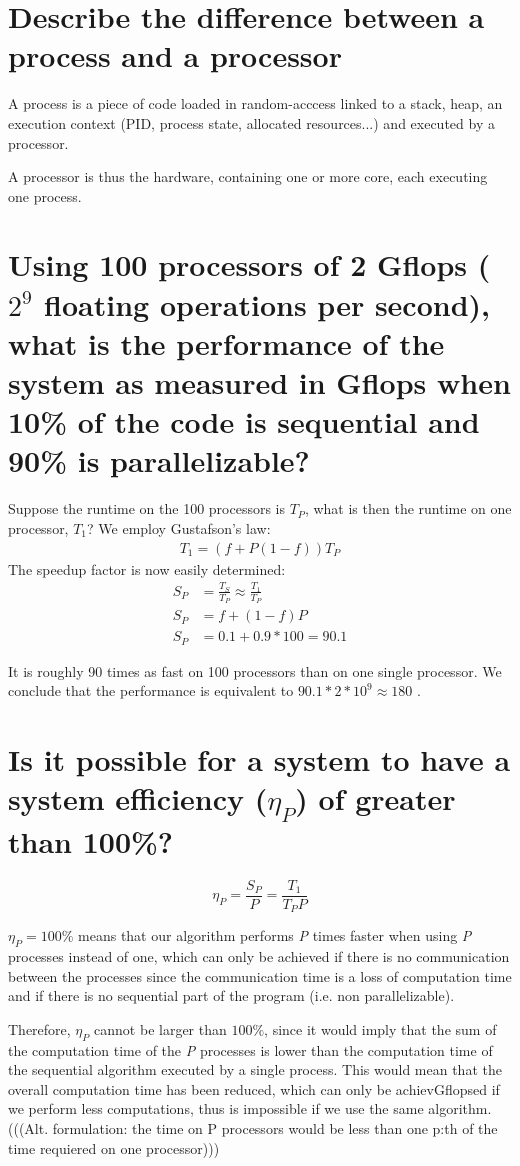 
\section{Describe the difference between a process and a processor}
A process is a piece of code loaded in random-acccess linked to a stack, heap, an execution context (PID, process state, allocated resources...) and executed by a processor.

A processor is thus the hardware, containing one or more core, each executing one process.


\section{Using 100 processors of 2 Gflops ($2^9$ floating operations per second), what is the performance of the system as measured in Gflops when 10\% of the code is sequential and 90\% is parallelizable?} 
Suppose the runtime on the 100 processors is  $T_P$, what is then the runtime on one processor, $T_1$? We employ Gustafson's law:
\begin{gather*}
T_1 = (f+P(1-f))T_P
\end{gather*}
The speedup factor is now easily determined:
\begin{align*}
S_P &= \frac{T_S}{T_P} \approx \frac{T_1}{T_P} \\
S_P &= f+(1-f)P \\ 
S_P &= 0.1+0.9*100 = 90.1 
\end{align*}

It is roughly 90 times as fast on 100 processors than on one single processor. We conclude that the performance is equivalent to $90.1*2*10^9\approx 180$ .


\section{Is it possible for a system to have a system efficiency ($\eta_P$) of greater than 100\%?}
\[\eta_P = \frac{S_P}{P} = \frac{T_1}{T_PP}  \]

$\eta_P = 100\%$ means that our algorithm performs \textit{P} times faster when using \textit{P} processes instead of one, which can only be achieved if there is no communication between the processes since the communication time is a loss of computation time and if there is no sequential part of the program (i.e. non parallelizable).

Therefore, $\eta_P$ cannot be larger than $100\%$, since it would imply that the sum of the computation time of the \textit{P} processes is lower than the computation time of the sequential algorithm executed by a single process. This would mean that the overall computation time has been reduced, which can only be achievGflopsed if we perform less computations, thus is impossible if we use the same algorithm.
\\
(((Alt. formulation: the time on P processors would be less than one p:th of the time requiered on one processor))) 

